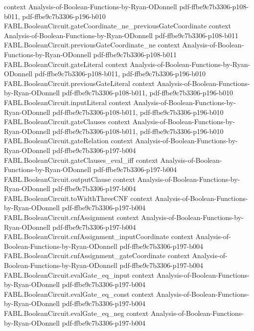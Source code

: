 \begin{theorem}
  {context}
  {Analysis-of-Boolean-Functions-by-Ryan-ODonnell}
  {pdf-ffbe9c7b3306-p108-b011,
    pdf-ffbe9c7b3306-p196-b010}
\proofstep
  {FABL.BooleanCircuit.gateCoordinate_ne_previousGateCoordinate}
  {context}
  {Analysis-of-Boolean-Functions-by-Ryan-ODonnell}
  {pdf-ffbe9c7b3306-p108-b011}
\proofstep
  {FABL.BooleanCircuit.previousGateCoordinate_ne}
  {context}
  {Analysis-of-Boolean-Functions-by-Ryan-ODonnell}
  {pdf-ffbe9c7b3306-p108-b011}
\proofstep
  {FABL.BooleanCircuit.gateLiteral}
  {context}
  {Analysis-of-Boolean-Functions-by-Ryan-ODonnell}
  {pdf-ffbe9c7b3306-p108-b011,
    pdf-ffbe9c7b3306-p196-b010}
\proofstep
  {FABL.BooleanCircuit.previousGateLiteral}
  {context}
  {Analysis-of-Boolean-Functions-by-Ryan-ODonnell}
  {pdf-ffbe9c7b3306-p108-b011,
    pdf-ffbe9c7b3306-p196-b010}
\proofstep
  {FABL.BooleanCircuit.inputLiteral}
  {context}
  {Analysis-of-Boolean-Functions-by-Ryan-ODonnell}
  {pdf-ffbe9c7b3306-p108-b011,
    pdf-ffbe9c7b3306-p196-b010}
\proofstep
  {FABL.BooleanCircuit.gateClauses}
  {context}
  {Analysis-of-Boolean-Functions-by-Ryan-ODonnell}
  {pdf-ffbe9c7b3306-p108-b011,
    pdf-ffbe9c7b3306-p196-b010}
\proofstep
  {FABL.BooleanCircuit.gateRelation}
  {context}
  {Analysis-of-Boolean-Functions-by-Ryan-ODonnell}
  {pdf-ffbe9c7b3306-p197-b004}
\proofstep
  {FABL.BooleanCircuit.gateClauses_eval_iff}
  {context}
  {Analysis-of-Boolean-Functions-by-Ryan-ODonnell}
  {pdf-ffbe9c7b3306-p197-b004}
\proofstep
  {FABL.BooleanCircuit.outputClause}
  {context}
  {Analysis-of-Boolean-Functions-by-Ryan-ODonnell}
  {pdf-ffbe9c7b3306-p197-b004}
\proofstep
  {FABL.BooleanCircuit.toWidthThreeCNF}
  {context}
  {Analysis-of-Boolean-Functions-by-Ryan-ODonnell}
  {pdf-ffbe9c7b3306-p197-b004}
\proofstep
  {FABL.BooleanCircuit.cnfAssignment}
  {context}
  {Analysis-of-Boolean-Functions-by-Ryan-ODonnell}
  {pdf-ffbe9c7b3306-p197-b004}
\proofstep
  {FABL.BooleanCircuit.cnfAssignment_inputCoordinate}
  {context}
  {Analysis-of-Boolean-Functions-by-Ryan-ODonnell}
  {pdf-ffbe9c7b3306-p197-b004}
\proofstep
  {FABL.BooleanCircuit.cnfAssignment_gateCoordinate}
  {context}
  {Analysis-of-Boolean-Functions-by-Ryan-ODonnell}
  {pdf-ffbe9c7b3306-p197-b004}
\proofstep
  {FABL.BooleanCircuit.evalGate_eq_input}
  {context}
  {Analysis-of-Boolean-Functions-by-Ryan-ODonnell}
  {pdf-ffbe9c7b3306-p197-b004}
\proofstep
  {FABL.BooleanCircuit.evalGate_eq_const}
  {context}
  {Analysis-of-Boolean-Functions-by-Ryan-ODonnell}
  {pdf-ffbe9c7b3306-p197-b004}
\proofstep
  {FABL.BooleanCircuit.evalGate_eq_neg}
  {context}
  {Analysis-of-Boolean-Functions-by-Ryan-ODonnell}
  {pdf-ffbe9c7b3306-p197-b004}

\end{theorem}
